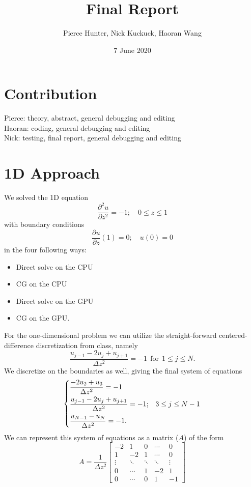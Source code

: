 \documentclass[11pt]{article}
\title{\textbf{Final Report}}
\author{Pierce Hunter, Nick Kuckuck, Haoran Wang}
\date{7 June 2020}
\newcommand{\pd}[2]{\frac{\partial #1}{\partial #2}}
\begin{document}
\maketitle
\section*{Contribution}
Pierce: theory, abstract, general debugging and editing\\
Haoran: coding, general debugging and editing\\
Nick: testing, final report, general debugging and editing\\

\section{1D Approach}
	We solved the 1D equation
	\begin{equation}
		\pd{^2u}{z^2} = -1; \quad 0\leq z\leq 1
	\end{equation}
	with boundary conditions
	\begin{equation}
		\pd{u}{z}\left(1\right) = 0; \quad u(0) = 0
	\end{equation}
	in the four following ways:
	\begin{itemize}
		\item Direct solve on the CPU
		\item CG on the CPU
		\item Direct solve on the GPU
		\item CG on the GPU.
	\end{itemize}
	For the one-dimensional problem we can utilize the straight-forward centered-difference discretization from class, namely
	\begin{equation}
		\frac{u_{j-1}-2u_j+u_{j+1}}{\Delta z^2} = -1 ~~\text{for}~~ 1\leq j\leq N.
	\end{equation}
	We discretize on the boundaries as well, giving the final system of equations
	\begin{equation}
		\begin{dcases}
		\frac{-2u_2 + u_3}{\Delta z^2} = -1\\
		\frac{u_{j-1}-2u_j+u_{j+1}}{\Delta z^2} = -1;& 3\leq j\leq N-1\\
		\frac{u_{N-1} - u_N}{\Delta z^2} = -1.
		\end{dcases}
	\end{equation}
	We can represent this system of equations as a matrix ($ A $) of the form
	\begin{equation}
		A = \frac{1}{\Delta z^2}\begin{bmatrix}
		-2&1&0&\cdots&0\\
		1&-2&1&\cdots&0\\
		\vdots&\ddots&\ddots&\ddots&\vdots\\
		0&\cdots&1&-2&1\\
		0&\cdots&0&1&-1
		\end{bmatrix}
	\end{equation}
\end{document}
